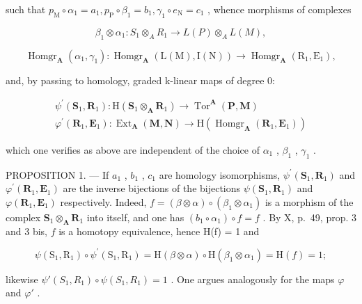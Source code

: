 such that \(p_{\mathrm{M}} \circ \alpha_{1} = a_{1}, p_{\mathrm{P}} \circ \beta_{1} = b_{1}, \gamma_{1} \circ e_{\mathrm{N}} = c_{1}\) , whence morphisms of complexes

\[
\beta_ {1} \otimes \alpha_ {1}: S _ {1} \otimes_ {A} R _ {1} \rightarrow L (P) \otimes_ {A} L (M),
\]

\[
\operatorname{Homgr} _ {\mathbf {A}} \left(\alpha_ {1}, \gamma_ {1}\right): \operatorname{Homgr} _ {\mathbf {A}} \left(\mathrm{L} (\mathrm{M}), \mathrm{I} (\mathrm{N})\right)\rightarrow \operatorname{Homgr} _ {\mathbf {A}} \left(\mathrm{R} _ {1}, \mathrm{E} _ {1}\right),
\]

and, by passing to homology, graded k-linear maps of degree 0:

\[
\begin{array}{l} \psi^ {\prime} (\mathbf {S} _ {1}, \mathbf {R} _ {1}): \mathrm{H} (\mathbf {S} _ {1} \otimes_ {\mathbf {A}} \mathbf {R} _ {1}) \to \operatorname{Tor} ^ {\mathbf {A}} (\mathbf {P}, \mathbf {M}) \\ \varphi^ {\prime} (\mathbf {R} _ {1}, \mathbf {E} _ {1}): \operatorname{Ext} _ {\mathbf {A}} (\mathbf {M}, \mathbf {N}) \to \mathrm{H} (\operatorname{Homgr} _ {\mathbf {A}} (\mathbf {R} _ {1}, \mathbf {E} _ {1})) \end{array}
\]

which one verifies as above are independent of the choice of \(\alpha_{1}\) , \(\beta_{1}\) , \(\gamma_{1}\) .

PROPOSITION 1. --- If \(a_{1}\) , \(b_{1}\) , \(c_{1}\) are homology isomorphisms, \(\psi^{\prime}(\mathbf{S}_{1},\mathbf{R}_{1})\) and \(\varphi^{\prime}(\mathbf{R}_{1},\mathbf{E}_{1})\) are the inverse bijections of the bijections \(\psi(\mathbf{S}_{1},\mathbf{R}_{1})\) and \(\varphi(\mathbf{R}_{1},\mathbf{E}_{1})\) respectively. Indeed, \(f = (\beta \otimes \alpha) \circ (\beta_{1} \otimes \alpha_{1})\) is a morphism of the complex \(\mathbf{S}_{1} \otimes_{\mathbf{A}} \mathbf{R}_{1}\) into itself, and one has \((b_{1} \circ \alpha_{1}) \circ f = f\) . By X, p.~49, prop. 3 and 3 bis, \(f\) is a homotopy equivalence, hence H(f) = 1 and

\[
\psi \left(\mathrm{S} _ {1}, \mathrm{R} _ {1}\right) \circ \psi^ {\prime} \left(\mathrm{S} _ {1}, \mathrm{R} _ {1}\right) = \mathrm{H} (\beta \otimes \alpha) \circ \mathrm{H} \left(\beta_ {1} \otimes \alpha_ {1}\right) = \mathrm{H} (f) = 1;
\]

likewise \(\psi'(S_1, R_1) \circ \psi(S_1, R_1) = 1\) . One argues analogously for the maps \(\varphi\) and \(\varphi'\) .

